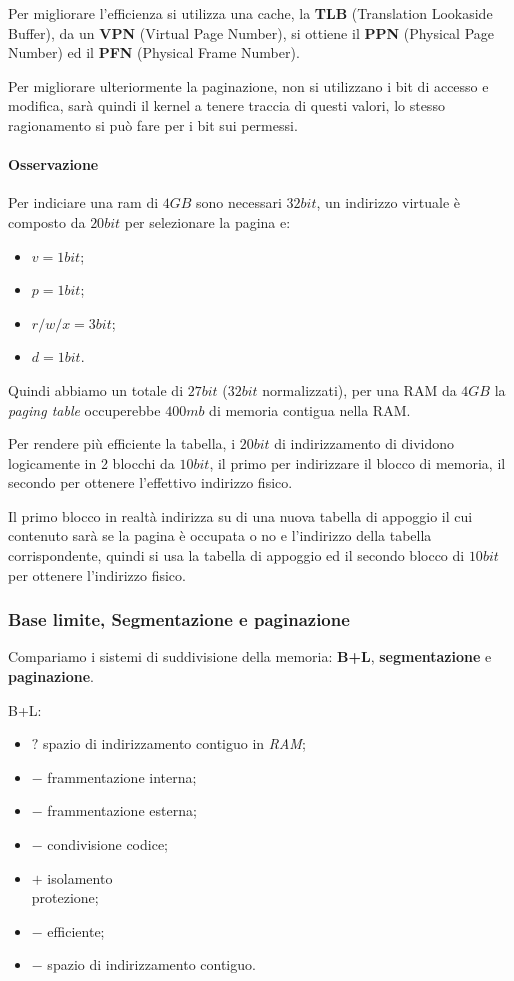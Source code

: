 Per migliorare l'efficienza si utilizza una cache, la \textbf{TLB}
(Translation Lookaside Buffer), da un \textbf{VPN} (Virtual Page Number),
si ottiene il \textbf{PPN} (Physical Page Number) ed il \textbf{PFN}
(Physical Frame Number).


Per migliorare ulteriormente la paginazione, non si utilizzano i bit di
accesso e modifica, sarà quindi il kernel a tenere traccia di questi valori,
lo stesso ragionamento si può fare per i bit sui permessi.

\paragraph{Osservazione}
Per indiciare una ram di $4GB$ sono necessari $32bit$, un indirizzo virtuale
è composto da $20bit$ per selezionare la pagina e:
\begin{itemize}
  \item $v=1bit$;
  \item $p=1bit$;
  \item $r/w/x=3bit$;
  \item $d=1bit$.
\end{itemize}

Quindi abbiamo un totale di $27bit$ ($32bit$ normalizzati), per una RAM da
$4GB$ la \emph{paging table} occuperebbe $400mb$ di memoria contigua nella
RAM.

Per rendere più efficiente la tabella, i $20bit$ di indirizzamento di dividono
logicamente in 2 blocchi da $10bit$, il primo per indirizzare il blocco di
memoria, il secondo per ottenere l'effettivo indirizzo fisico.

Il primo blocco in realtà indirizza su di una nuova tabella di appoggio il cui
contenuto sarà se la pagina è occupata o no e l'indirizzo della tabella
corrispondente, quindi si usa la tabella di appoggio ed il secondo blocco di
$10bit$ per ottenere l'indirizzo fisico.

\subsubsection{Base limite, Segmentazione e paginazione}
Compariamo i sistemi di suddivisione della memoria: \textbf{B+L}, \textbf{
segmentazione} e \textbf{paginazione}.

B+L:
\begin{itemize}
  \item $?$ spazio di indirizzamento contiguo in \emph{RAM};
  \item $-$ frammentazione interna;
  \item $-$ frammentazione esterna;
  \item $-$ condivisione codice;
  \item $+$ isolamento\\protezione;
  \item $-$ efficiente;
  \item $-$ spazio di indirizzamento contiguo.
\end{itemize}

